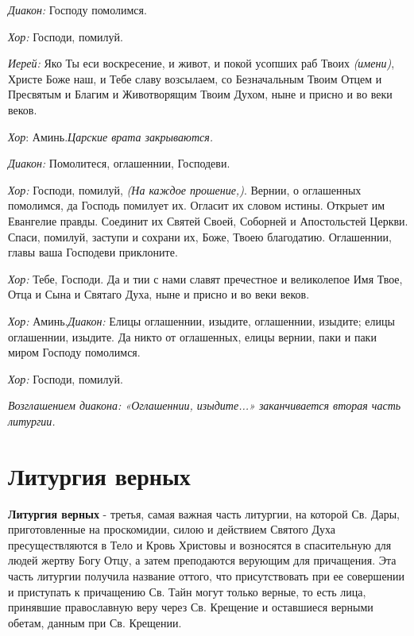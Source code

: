  {\itshape Диакон:} Господу помолимся.

 {\itshape Хор:} Господи, помилуй.

 {\itshape Иерей:} Яко Ты еси воскресение, и живот, и покой усопших раб Твоих {\itshape (имени)}, Христе Боже наш, и Тебе славу возсылаем, со Безначальным Твоим Отцем и Пресвятым и Благим и Животворящим Твоим Духом, ныне и присно и во веки веков.

 {\itshape Хор}: Аминь.{\itshape  Царские врата закрываются.} 


 {\itshape Диакон:} Помолитеся, оглашеннии, Господеви.

 {\itshape Хор:} Господи, помилуй, {\itshape (На каждое прошение,)}. Вернии, о оглашенных помолимся, да Господь помилует их. Огласит их словом истины. Открыет им Евангелие правды. Соединит их Святей Своей, Соборней и Апостольстей Церкви. Спаси, помилуй, заступи и сохрани их, Боже, Твоею благодатию. Оглашеннии, главы ваша Господеви приклоните.

 {\itshape Хор:} Тебе, Господи. Да и тии с нами славят пречестное и великолепое Имя Твое, Отца и Сына и Святаго Духа, ныне и присно и во веки веков.

 {\itshape Хор:} Аминь.{\itshape  Диакон:} Елицы оглашеннии, изыдите, оглашеннии, изыдите; елицы оглашеннии, изыдите. Да никто от оглашенных, елицы вернии, паки и паки миром Господу помолимся.

 {\itshape Хор:} Господи, помилуй.

 {\itshape Возглашением диакона: «Оглашеннии, изыдите...» заканчивается вторая часть литургии.}

\section{Литургия верных}

{\bfseries Литургия верных} - третья, самая важная часть литургии, на которой Св. Дары, приготовленные на проскомидии, силою и действием Святого Духа пресуществляются в Тело и Кровь Христовы и возносятся в спасительную для людей жертву Богу Отцу, а затем преподаются верующим для причащения. Эта часть литургии получила название оттого, что присутствовать при ее совершении и приступать к причащению Св. Тайн могут только верные, то есть лица, принявшие православную веру через Св. Крещение и оставшиеся верными обетам, данным при Св. Крещении.  


